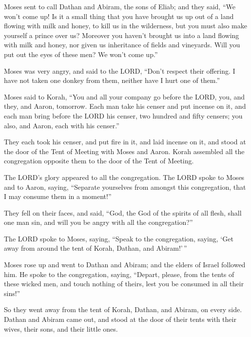  Moses sent to call Dathan and Abiram, the sons of Eliab;
and they said, ``We won't come up!  Is it a small thing
that you have brought us up out of a land flowing with milk and honey,
to kill us in the wilderness, but you must also make yourself a prince
over us?  Moreover you haven't brought us into a land
flowing with milk and honey, nor given us inheritance of fields and
vineyards. Will you put out the eyes of these men? We won't come up.''

 Moses was very angry, and said to the LORD, ``Don't
respect their offering. I have not taken one donkey from them, neither
have I hurt one of them.''

 Moses said to Korah, ``You and all your company go
before the LORD, you, and they, and Aaron, tomorrow. 
Each man take his censer and put incense on it, and each man bring
before the LORD his censer, two hundred and fifty censers; you also, and
Aaron, each with his censer.''

 They each took his censer, and put fire in it, and laid
incense on it, and stood at the door of the Tent of Meeting with Moses
and Aaron.  Korah assembled all the congregation opposite
them to the door of the Tent of Meeting.

The LORD's glory appeared to all the congregation.  The
LORD spoke to Moses and to Aaron, saying,  ``Separate
yourselves from amongst this congregation, that I may consume them in a
moment!''

 They fell on their faces, and said, ``God, the God of
the spirits of all flesh, shall one man sin, and will you be angry with
all the congregation?''

 The LORD spoke to Moses, saying,  ``Speak
to the congregation, saying, `Get away from around the tent of Korah,
Dathan, and Abiram!'\,''

 Moses rose up and went to Dathan and Abiram; and the
elders of Israel followed him.  He spoke to the
congregation, saying, ``Depart, please, from the tents of these wicked
men, and touch nothing of theirs, lest you be consumed in all their
sins!''

 So they went away from the tent of Korah, Dathan, and
Abiram, on every side. Dathan and Abiram came out, and stood at the door
of their tents with their wives, their sons, and their little ones.

